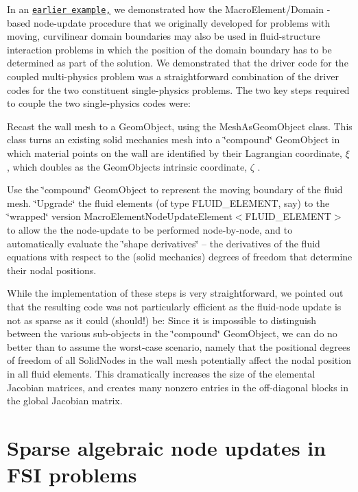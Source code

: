 In an \href{../../fsi_collapsible_channel/html/index.html}{\tt earlier example,} we demonstrated how the {\ttfamily Macro\+Element/\+Domain} -\/ based node-\/update procedure that we originally developed for problems with moving, curvilinear domain boundaries may also be used in fluid-\/structure interaction problems in which the position of the domain boundary has to be determined as part of the solution. We demonstrated that the driver code for the coupled multi-\/physics problem was a straightforward combination of the driver codes for the two constituent single-\/physics problems. The two key steps required to couple the two single-\/physics codes were\+:
\begin{DoxyEnumerate}
\item Recast the wall mesh to a {\ttfamily Geom\+Object}, using the {\ttfamily Mesh\+As\+Geom\+Object} class. This class turns an existing solid mechanics mesh into a \char`\"{}compound\char`\"{} {\ttfamily Geom\+Object} in which material points on the wall are identified by their Lagrangian coordinate, $ \xi $ , which doubles as the {\ttfamily Geom\+Object\textquotesingle{}s} intrinsic coordinate, $ \zeta $ . ~\newline
~\newline

\item Use the \char`\"{}compound\char`\"{} {\ttfamily Geom\+Object} to represent the moving boundary of the fluid mesh. \char`\"{}\+Upgrade\char`\"{} the fluid elements (of type {\ttfamily F\+L\+U\+I\+D\+\_\+\+E\+L\+E\+M\+E\+NT}, say) to the \char`\"{}wrapped\char`\"{} version {\ttfamily Macro\+Element\+Node\+Update\+Element$<$\+F\+L\+U\+I\+D\+\_\+\+E\+L\+E\+M\+E\+N\+T$>$} to allow the the node-\/update to be performed node-\/by-\/node, and to automatically evaluate the \char`\"{}shape derivatives\char`\"{} -- the derivatives of the fluid equations with respect to the (solid mechanics) degrees of freedom that determine their nodal positions. ~\newline
~\newline

\end{DoxyEnumerate}While the implementation of these steps is very straightforward, we pointed out that the resulting code was not particularly efficient as the fluid-\/node update is not as sparse as it could (should!) be\+: Since it is impossible to distinguish between the various sub-\/objects in the \char`\"{}compound\char`\"{} {\ttfamily Geom\+Object}, we can do no better than to assume the worst-\/case scenario, namely that the positional degrees of freedom of all {\ttfamily Solid\+Nodes} in the wall mesh potentially affect the nodal position in all fluid elements. This dramatically increases the size of the elemental Jacobian matrices, and creates many nonzero entries in the off-\/diagonal blocks in the global Jacobian matrix.\hypertarget{index_alg_sparse}{}\section{Sparse algebraic node updates in F\+S\+I problems}\label{index_alg_sparse}
